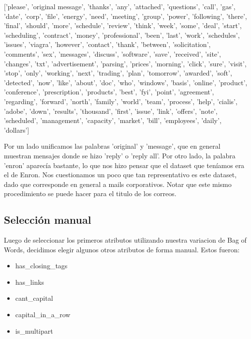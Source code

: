\documentclass[10pt,a4paper]{article}
\begin{document}
['please', 'original message', 'thanks', 'any', 'attached', 'questions', 'call', 'gas', 'date', 'corp', 'file',
	'energy', 'need', 'meeting', 'group', 'power', 'following', 'there', 'final', 'should', 'more', 'schedule',
	'review', 'think', 'week', 'some', 'deal', 'start', 'scheduling', 'contract', 'money', 'professional', 'been',
	'last', 'work', 'schedules', 'issues', 'viagra', 'however', 'contact', 'thank', 'between', 'solicitation', 'comments',
	'sex', 'messages', 'discuss', 'software', 'save', 'received', 'site', 'changes', 'txt', 'advertisement', 'parsing', 'prices',
	'morning', 'click', 'sure', 'visit', 'stop', 'only', 'working', 'next', 'trading', 'plan', 'tomorrow',
	'awarded', 'soft', 'detected', 'now', 'like', 'about', 'doc', 'who', 'windows', 'basis', 'online', 'product', 'conference',
	'prescription', 'products', 'best', 'fyi', 'point', 'agreement', 'regarding', 'forward', 'north', 'family', 'world', 'team',
	'process', 'help', 'cialis', 'adobe', 'down', 'results', 'thousand', 'first', 'issue', 'link', 'offers', 'note',
	'scheduled', 'management', 'capacity', 'market', 'bill', 'employees', 'daily', 'dollars']

\pagebreak

Por un lado unificamos las palabras 'original' y 'message', que en general muestran mensajes donde se hizo 'reply' o 'reply all'. Por otro lado, la palabra 'enron' aparecía bastante, lo que nos hizo pensar que el dataset que teníamos era el de Enron. Nos cuestionamos un poco que tan representativo es este dataset, dado que corresponde en general a mails corporativos. Notar que este mismo procedimiento se puede hacer para el titulo de los correos.

\subsection{Selección manual}

Luego de seleccionar los primeros atributos utilizando nuestra variacion de Bag of Words, decidimos elegir algunos otros atributos de forma manual. Estos fueron:

\begin{itemize}
	\item has\_closing\_tags
	\item has\_links
	\item cant\_capital
	\item capital_in_a_row
	\item is\_multipart
\end{itemize}
\end{document}
